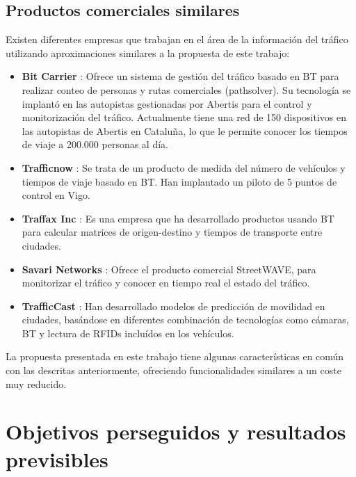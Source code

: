 \documentclass[twocolumn,twoside]{Jornadas}
\begin{document}
\subsection{Productos comerciales similares}

Existen diferentes empresas que trabajan en el área de la información del tráfico utilizando aproximaciones similares a la propuesta de este trabajo:

\begin{itemize}

 \item \textbf{Bit Carrier} \cite{patenteBC} \cite{BitCarrier}: Ofrece un sistema de gestión del tráfico basado en BT para realizar conteo de personas y rutas comerciales 
(pathsolver). Su tecnología se implantó en las autopistas gestionadas por Abertis para el control y monitorización del tráfico. Actualmente tiene una red de 
150 dispositivos en las autopistas de Abertis en Cataluña, lo que le permite conocer los tiempos de viaje a 200.000 personas al día.

 \item \textbf{Trafficnow} \cite{Trafficnow}: Se trata de un producto de medida del número de vehículos y tiempos de viaje basado en BT. Han implantado 
un piloto de 5 puntos de control en Vigo.

 \item \textbf{Traffax Inc} \cite{TraffaxInc}: Es una empresa que ha desarrollado productos usando BT para calcular matrices de origen-destino y tiempos de transporte entre ciudades.

 \item \textbf{Savari Networks} \cite{SavariNetworks}: Ofrece el producto comercial StreetWAVE, para monitorizar el tráfico y conocer en tiempo real el estado del tráfico.

 \item \textbf{TrafficCast} \cite{TrafficCast}: Han desarrollado modelos de predicción de movilidad en ciudades, basándose en diferentes 
combinación de tecnologías como cámaras, BT y lectura de RFIDs incluídos en los vehículos.

\end{itemize}


La propuesta presentada en este trabajo tiene algunas características en común con las descritas anteriormente, ofreciendo funcionalidades similares a un coste muy reducido. 


\section{Objetivos perseguidos y resultados previsibles}
\label{obj}
\end{document}
